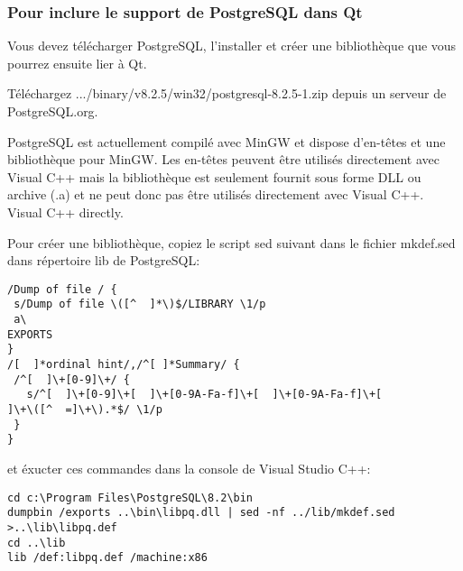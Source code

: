% 
% 
% 

\subsubsection{Pour inclure le support de PostgreSQL dans Qt}
Vous devez télécharger PostgreSQL, l'installer et créer une bibliothèque que vous pourrez ensuite lier à Qt.

Téléchargez  .../binary/v8.2.5/win32/postgresql-8.2.5-1.zip depuis un serveur de PostgreSQL.org.

PostgreSQL est actuellement compilé avec MinGW et dispose d'en-têtes et une bibliothèque pour MinGW.   Les en-têtes peuvent être utilisés directement avec Visual C++ mais la bibliothèque est seulement fournit sous forme DLL ou archive (.a) et ne peut donc pas être utilisés directement avec Visual C++.
Visual C++ directly.

Pour créer une bibliothèque, copiez le script sed suivant dans le fichier mkdef.sed dans répertoire lib de PostgreSQL:

\begin{verbatim}
/Dump of file / {
 s/Dump of file \([^  ]*\)$/LIBRARY \1/p
 a\
EXPORTS
}
/[  ]*ordinal hint/,/^[ ]*Summary/ {
 /^[  ]\+[0-9]\+/ {
   s/^[  ]\+[0-9]\+[  ]\+[0-9A-Fa-f]\+[  ]\+[0-9A-Fa-f]\+[ 
]\+\([^  =]\+\).*$/ \1/p
 }
}
\end{verbatim}

et éxucter ces commandes dans la console de Visual Studio C++:

\begin{verbatim}
cd c:\Program Files\PostgreSQL\8.2\bin
dumpbin /exports ..\bin\libpq.dll | sed -nf ../lib/mkdef.sed >..\lib\libpq.def
cd ..\lib
lib /def:libpq.def /machine:x86
\end{verbatim}

